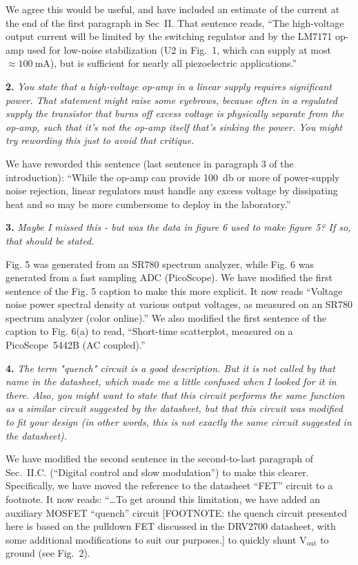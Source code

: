 \documentclass[12pt, oneside]{letter}   	%
\begin{document}
We agree this would be useful, and have included an estimate of the current at the end of the first paragraph in Sec~II.
That sentence reads, ``The high-voltage output current will be limited by the switching regulator and by the LM7171 op-amp used for low-noise stabilization (U2 in Fig.~1, which can supply at most $\approx\SI{100}{\milli\ampere}$), but is sufficient for nearly all piezoelectric applications.''

\textbf{2.}
\textit{You state that a high-voltage op-amp in a linear supply requires significant power.
That statement might raise some eyebrows, because often in a regulated supply the transistor that burns off excess voltage is physically separate from the op-amp, such that it's not the op-amp itself that's sinking the power. 
You might try rewording this just to avoid that critique.}

We have reworded this sentence (last sentence in paragraph 3 of the introduction): ``While the op-amp can provide \SI{100}{\decibel} or more of power-supply noise rejection, linear regulators must handle any excess voltage by dissipating heat and so may be more cumbersome to deploy in the laboratory.''


\textbf{3.}
\textit{Maybe I missed this - but was the data in figure 6 used to make figure 5? If so, that should be stated.}

Fig. 5 was generated from an SR780 spectrum analyzer, while Fig. 6 was generated from a fast sampling ADC (PicoScope).
We have modified the first sentence of the Fig. 5 caption to make this more explicit.
It now reads ``Voltage noise power spectral density at various output voltages, as measured on an SR780 spectrum analyzer (color online).''
We also modified the first sentence of the caption to Fig. 6(a) to read, ``Short-time scatterplot, measured on a PicoScope~5442B (AC coupled).''

\textbf{4.}
\textit{The term "quench" circuit is a good description. But it is not called by that name in the datasheet, which made me a little confused when I looked for it in there. Also, you might want to state that this circuit performs the same function as a similar circuit suggested by the datasheet, but that this circuit was modified to fit your design (in other words, this is not exactly the same circuit suggested in the datasheet).}

We have modified the second sentence in the second-to-last paragraph of Sec.~II.C. (``Digital control and slow modulation'') to make this clearer.
Specifically, we have moved the reference to the datasheet ``FET'' circuit to a footnote.
It now reads: ``\ldots To get around this limitation, we have added an auxiliary MOSFET ``quench'' circuit [FOOTNOTE: the quench circuit presented here is based on the pulldown FET discussed in the DRV2700 datasheet, with some additional modifications to suit our purposes.] to quickly shunt $\text{V}_\text{out}$ to ground (see Fig.~2).
\end{document}
